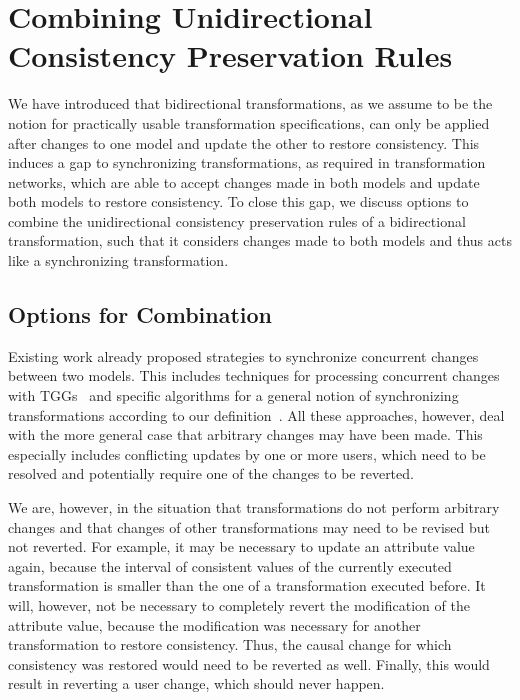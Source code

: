 \section{Combining Unidirectional Consistency Preservation Rules}

We have introduced that bidirectional transformations, as we assume to be the notion for practically usable transformation specifications, can only be applied after changes to one model and update the other to restore consistency.
This induces a gap to synchronizing transformations, as required in transformation networks, which are able to accept changes made in both models and update both models to restore consistency.
To close this gap, we discuss options to combine the unidirectional consistency preservation rules of a bidirectional transformation, such that it considers changes made to both models and thus acts like a synchronizing transformation.


\subsection{Options for Combination}
\label{chap:synchronization:combination:options}

Existing work already proposed strategies to synchronize concurrent changes between two models.
This includes techniques for processing concurrent changes with \glspl{TGG}~\cite{hermann2012concurrentSynchronization-FASE,orejas2020IncrementalConcurrentSynchronization-FASE} and specific algorithms for a general notion of synchronizing transformations according to our definition~\cite{xiong2013SynchronizingConcurrentUpdates-SoSym,xiong2009parallelUpdates-ICMT}.
All these approaches, however, deal with the more general case that arbitrary changes may have been made.
This especially includes conflicting updates by one or more users, which need to be resolved and potentially require one of the changes to be reverted.

We are, however, in the situation that transformations do not perform arbitrary changes and that changes of other transformations may need to be revised but not reverted.
For example, it may be necessary to update an attribute value again, because the interval of consistent values of the currently executed transformation is smaller than the one of a transformation executed before.
It will, however, not be necessary to completely revert the modification of the attribute value, because the modification was necessary for another transformation to restore consistency.
Thus, the causal change for which consistency was restored would need to be reverted as well.
Finally, this would result in reverting a user change, which should never happen.

